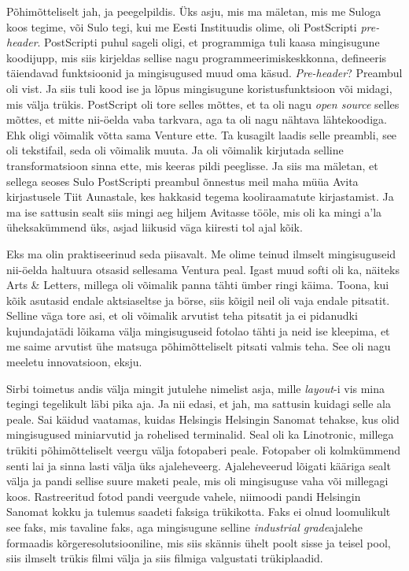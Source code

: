 Põhimõtteliselt jah, ja peegelpildis. Üks asju, mis ma mäletan, mis me Suloga koos tegime, või Sulo tegi, kui me Eesti Instituudis olime, oli PostScripti \emph{pre-header}. PostScripti puhul sageli oligi, et programmiga tuli kaasa mingisugune koodijupp, mis siis kirjeldas sellise nagu programmeerimiskeskkonna, defineeris täiendavad funktsioonid ja mingisugused muud oma käsud. \emph{Pre-header}? Preambul oli vist. Ja siis tuli  kood ise ja lõpus mingisugune koristusfunktsioon või midagi, mis välja trükis. PostScript oli tore selles mõttes, et ta oli nagu \emph{open source} selles mõttes, et mitte nii-öelda vaba tarkvara, aga ta oli nagu nähtava lähtekoodiga. Ehk oligi võimalik võtta sama Venture ette. Ta kusagilt laadis selle preambli, see oli tekstifail, seda oli võimalik muuta. Ja oli võimalik kirjutada selline transformatsioon sinna ette, mis keeras pildi peeglisse. Ja siis ma mäletan, et sellega seoses Sulo PostScripti preambul õnnestus meil maha müüa Avita kirjastusele Tiit Aunastale, kes hakkasid tegema kooliraamatute kirjastamist. Ja ma ise sattusin sealt siis mingi aeg hiljem  Avitasse tööle, mis oli ka mingi a'la üheksakümmend üks, asjad liikusid väga kiiresti tol ajal kõik.


Eks ma olin praktiseerinud seda piisavalt. Me olime teinud ilmselt mingisuguseid nii-öelda haltuura otsasid sellesama Ventura peal. Igast muud softi oli ka, näiteks Arts \& Letters, millega oli võimalik panna tähti ümber ringi käima. Toona, kui kõik asutasid endale aktsiaseltse ja börse, siis kõigil neil oli vaja endale pitsatit. Selline väga tore asi, et oli võimalik arvutist teha pitsatit ja ei pidanudki kujundajatädi lõikama välja mingisuguseid fotolao tähti ja neid  ise  kleepima, et me saime arvutist ühe matsuga põhimõtteliselt pitsati valmis teha. See oli nagu meeletu innovatsioon, eksju. 

Sirbi  toimetus andis välja mingit jutulehe nimelist asja, mille  \emph{layout}-i vis mina tegingi tegelikult läbi pika aja. Ja nii edasi, et jah, ma sattusin kuidagi selle ala peale. Sai käidud vaatamas, kuidas Helsingis Helsingin Sanomat tehakse, kus olid mingisugused miniarvutid ja   rohelised terminalid. Seal oli ka Linotronic, millega trükiti põhimõtteliselt veergu välja fotopaberi peale. Fotopaber oli kolmkümmend senti lai ja sinna lasti välja  üks ajaleheveerg. Ajaleheveerud lõigati kääriga sealt välja ja pandi sellise suure maketi peale, mis oli mingisuguse vaha või millegagi koos. Rastreeritud fotod pandi veergude vahele, niimoodi pandi Helsingin Sanomat kokku ja tulemus saadeti faksiga trükikotta. Faks ei olnud loomulikult see faks, mis tavaline faks, aga mingisugune selline \emph{industrial grade}ajalehe formaadis kõrgeresolutsiooniline,  mis siis  skännis ühelt poolt sisse ja teisel pool, siis  ilmselt trükis filmi välja ja siis filmiga valgustati trükiplaadid. 


